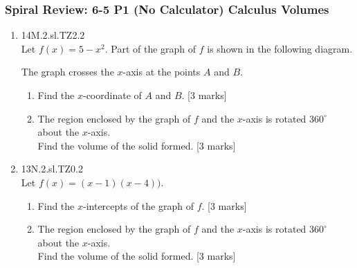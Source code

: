 \documentclass[12pt, twoside]{article}
\begin{document}
\subsubsection*{Spiral Review: 6-5 P1 (No Calculator) Calculus Volumes}
 \begin{enumerate}

  \item 14M.2.sl.TZ2.2\\
  Let $f(x)=5-x^2$. Part of the graph of $f$ is shown in the following diagram.
    \begin{center}
    \end{center}
    The graph crosses the $x$-axis at the points $A$ and $B$.
    \begin{enumerate}
      \item Find the $x$-coordinate of $A$ and $B$. [3 marks]
      \item The region enclosed by the graph of $f$ and the $x$-axis is rotated $360^\circ$ about the $x$-axis.\\
      Find the volume of the solid formed. [3 marks]
    \end{enumerate}


   \item 13N.2.sl.TZ0.2\\
   Let $f(x)=(x-1)(x-4))$.
   \begin{enumerate}
     \item Find the $x$-intercepts of the graph of $f$. [3 marks]
     \item The region enclosed by the graph of $f$ and the $x$-axis is rotated $360^\circ$ about the $x$-axis.\\
     Find the volume of the solid formed. [3 marks]
   \end{enumerate}


\end{enumerate}
\end{document}
